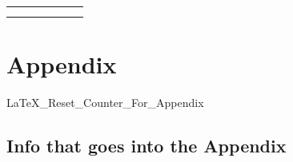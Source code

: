 \documentclass[onesided]{article}\usepackage[]{graphicx}\usepackage[]{color}
\begin{document}
\begin{table}[]
\begin{tabular}{ccccll}
                                                 &                                              &                                         &                              &                         &                          \\
                                                 &                                              &                                         &                              &                         &                         
\end{tabular}
\end{table}




\newpage
{}
\setcounter{page}{1}
\printbibliography









\clearpage
\newpage
{}



\begin{center}
\dotfill
{} \dotfill
\dotfill
{}
\end{center}

\clearpage



\newpage
{}
\setcounter{page}{1}
\section{Appendix} 

{LaTeX_Reset_Counter_For_Appendix}

\subsection{Info that goes into the Appendix}


\end{document}
